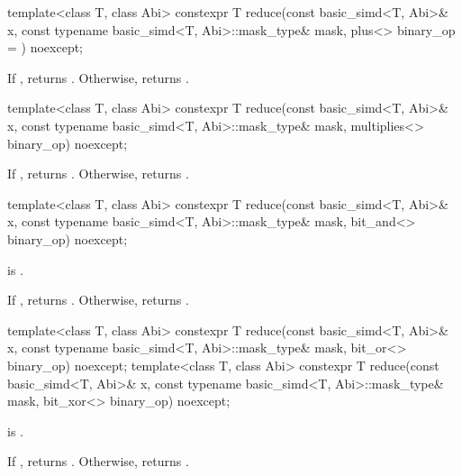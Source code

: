 \begin{itemdecl}
template<class T, class Abi>
  constexpr T reduce(const basic_simd<T, Abi>& x, const typename basic_simd<T, Abi>::mask_type& mask,
                     plus<> binary_op = {}) noexcept;
\end{itemdecl}

\begin{itemdescr}
  \pnum\returns
  If , returns . Otherwise, returns  \forallmaskedi.
\end{itemdescr}

\begin{itemdecl}
template<class T, class Abi>
  constexpr T reduce(const basic_simd<T, Abi>& x, const typename basic_simd<T, Abi>::mask_type& mask,
                     multiplies<> binary_op) noexcept;
\end{itemdecl}

\begin{itemdescr}
  \pnum\returns
  If , returns . Otherwise, returns  \forallmaskedi.
\end{itemdescr}

\begin{itemdecl}
template<class T, class Abi>
  constexpr T reduce(const basic_simd<T, Abi>& x, const typename basic_simd<T, Abi>::mask_type& mask,
                     bit_and<> binary_op) noexcept;
\end{itemdecl}

\begin{itemdescr}
  \pnum\constraints
   is .

  \pnum\returns
  If , returns . Otherwise, returns  \forallmaskedi.
\end{itemdescr}

\begin{itemdecl}
template<class T, class Abi>
  constexpr T reduce(const basic_simd<T, Abi>& x, const typename basic_simd<T, Abi>::mask_type& mask,
                     bit_or<> binary_op) noexcept;
template<class T, class Abi>
  constexpr T reduce(const basic_simd<T, Abi>& x, const typename basic_simd<T, Abi>::mask_type& mask,
                     bit_xor<> binary_op) noexcept;
\end{itemdecl}

\begin{itemdescr}
  \pnum\constraints
   is .

  \pnum\returns
  If , returns . Otherwise, returns  \forallmaskedi.
\end{itemdescr}

